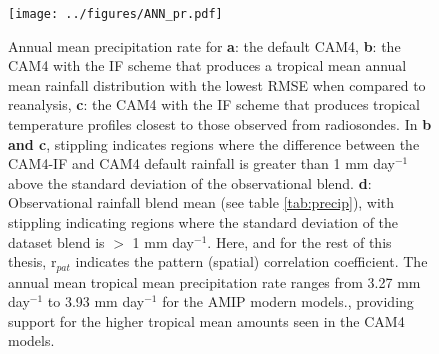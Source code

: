 \documentclass[letterpaper,12pt,titlepage,oneside,final]{book}
\begin{document}
\begin{figure}[H]
\centering
\noindent\texttt{[image: ../figures/ANN\_pr.pdf]}\hfill
\caption{Annual mean precipitation rate for \textbf{a}: the default CAM4, \textbf{b}: the CAM4 with the IF scheme that produces a tropical mean annual mean rainfall distribution with the lowest RMSE when compared to reanalysis, \textbf{c}: the CAM4 with the IF scheme that produces tropical temperature profiles closest to those observed from radiosondes. In \textbf{b and c}, stippling indicates regions where the difference between the CAM4-IF and CAM4 default rainfall is greater than 1 mm day$^{-1}$ above the standard deviation of the observational blend. \textbf{d}: Observational rainfall blend mean (see table \ref{tab:precip}), with stippling indicating regions where the standard deviation of the dataset blend is $>$ 1 mm day$^{-1}$. Here, and for the rest of this thesis, r$_{pat}$ indicates the pattern (spatial) correlation coefficient. The annual mean tropical mean precipitation rate ranges from 3.27 mm day$^{-1}$ to 3.93 mm day$^{-1}$  for the AMIP modern models., providing support for the higher tropical mean amounts seen in the CAM4 models.}
\label{fig:3.1}
\end{figure}
\end{document}
